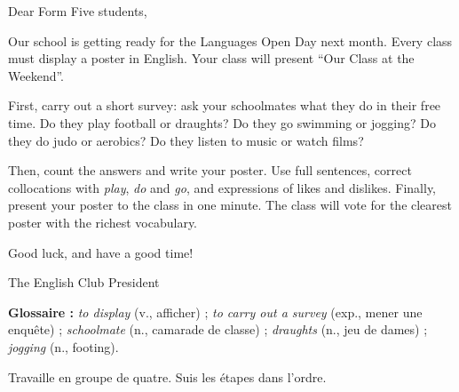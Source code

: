 \documentclass[11pt]{article}
\newcounter{popsec}
\newcounter{popsub}
\newcommand{\courssub}[1]{%
  \stepcounter{popsub}%
  \par\vspace{9pt}\noindent{\popxbold\fontsize{11.5}{13}\selectfont\color{popink}{\color{poporange}\thepopsec.\thepopsub}\hspace{6pt}#1}\par\nopagebreak\vspace{4pt}
}
\begin{document}
\begin{textebox}
Dear Form Five students,

Our school is getting ready for the Languages Open Day next month. Every class must display a poster in English. Your class will present “Our Class at the Weekend”.

First, carry out a short survey: ask your schoolmates what they do in their free time. Do they play football or draughts? Do they go swimming or jogging? Do they do judo or aerobics? Do they listen to music or watch films?

Then, count the answers and write your poster. Use full sentences, correct collocations with \emph{play}, \emph{do} and \emph{go}, and expressions of likes and dislikes. Finally, present your poster to the class in one minute. The class will vote for the clearest poster with the richest vocabulary.

Good luck, and have a good time!

The English Club President
\end{textebox}

\textbf{Glossaire :} \emph{to display} (v., afficher) ; \emph{to carry out a survey} (exp., mener une enquête) ; \emph{schoolmate} (n., camarade de classe) ; \emph{draughts} (n., jeu de dames) ; \emph{jogging} (n., footing).

\courssub{Consignes}

Travaille en groupe de quatre. Suis les étapes dans l'ordre.
\end{document}
